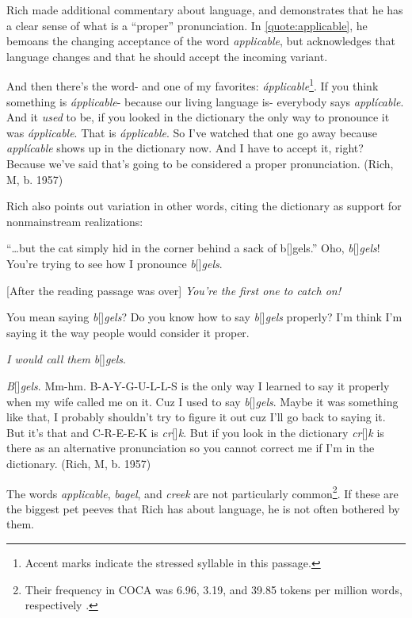 Rich made additional commentary about language, and demonstrates that he has a clear sense of what is a ``proper'' pronunciation. In \ref{quote:applicable}, he bemoans the changing acceptance of the word \textit{applicable}, but acknowledges that language changes and that he should accept the incoming variant.
\begin{num_quote} %
    And then there's the word- and one of my favorites: \textit{\'{a}pplicable}\footnote{Accent marks indicate the stressed syllable in this passage.}. If you think something is \textit{\'{a}pplicable}- because our living language is- everybody says \textit{appl\'{i}cable}. And it \textit{used} to be, if you looked in the dictionary the only way to pronounce it was \textit{\'{a}pplicable}. That is \textit{\'{a}pplicable}. So I've watched that one go away because \textit{appl\'{i}cable} shows up in the dictionary now. And I have to accept it, right? Because we've said that's going to be considered a proper pronunciation. (Rich, M, b. 1957)
    \label{quote:applicable}
\end{num_quote}
Rich also points out variation in other words, citing the dictionary as support for nonmainstream realizations:
\begin{num_quote} %
    [As a part of the reading passage] ``\ldots but the cat simply hid in the corner behind a sack of b[]gels.'' Oho, \textit{b}[]\textit{gels}! You're trying to see how I pronounce \textit{b}[]\textit{gels}.

    [After the reading passage was over] \textit{You're the first one to catch on!}
    
    You mean saying \textit{b}[]\textit{gels}? Do you know how to say \textit{b}[]\textit{gels} properly? I'm think I'm saying it the way people would consider it proper.
    
    \textit{I would call them} \textit{b}[]\textit{gels}.
    
    \textit{B}[]\textit{gels}. Mm-hm. B-A-Y-G-U-L-L-S is the only way I learned to say it properly when my wife called me on it. Cuz I used to say \textit{b}[\textipa{\ae}]\textit{gels}. Maybe it was something like that, I probably shouldn't try to figure it out cuz I'll go back to saying it. But it's that and C-R-E-E-K is \textit{cr}[]\textit{k}. But if you look in the dictionary \textit{cr}[]\textit{k} is there as an alternative pronunciation so you cannot correct me if I'm in the dictionary. (Rich, M, b. 1957)
    \label{quote:bagels}
\end{num_quote}
The words \textit{applicable}, \textit{bagel}, and \textit{creek} are not particularly common\footnote{Their frequency in COCA was 6.96, 3.19, and 39.85 tokens per million words, respectively \citep{davies_2008_coca}.}. If these are the biggest pet peeves that Rich has about language, he is not often bothered by them.

